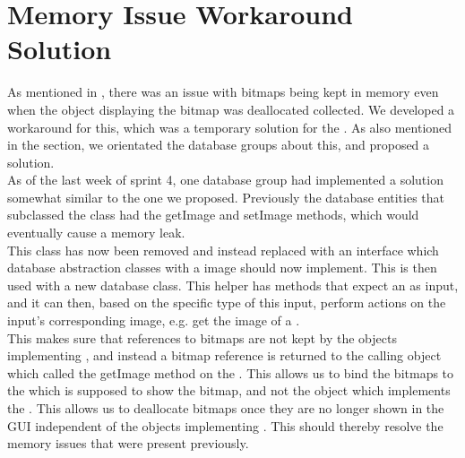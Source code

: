 
\section{Memory Issue Workaround Solution}
\label{sec:memory_issue_workaround_solution}

As mentioned in , there was an issue with bitmaps being kept in memory even when the object displaying the bitmap was deallocated collected. We developed a workaround for this, which was a temporary solution for the . As also mentioned in the section, we orientated the database groups about this, and proposed a solution. \\

As of the last week of sprint 4, one database group had implemented a solution somewhat similar to the one we proposed. Previously the database entities that subclassed the  class had the getImage and setImage methods, which would eventually cause a memory leak. \\

This class has now been removed and instead replaced with an  interface which database abstraction classes with a image should now implement. This  is then used with a new  database class. This helper has methods that expect an  as input, and it can then, based on the specific type of this input, perform actions on the input's corresponding image, e.g. get the image of a . \\

This makes sure that references to bitmaps are not kept by the objects implementing , and instead a bitmap reference is returned to the calling object which called the getImage method on the . This allows us to bind the bitmaps to the  which is supposed to show the bitmap, and not the object which implements the . This allows us to deallocate bitmaps once they are no longer shown in the GUI independent of the objects implementing . This should thereby resolve the memory issues that were present previously. 